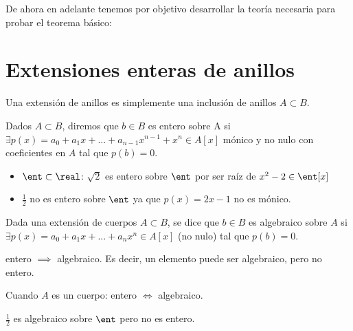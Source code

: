 De ahora en adelante tenemos por objetivo desarrollar la teoría necesaria para probar el teorema básico:

\section{Extensiones enteras de anillos}

Una extensión de anillos es simplemente una inclusión de anillos $A\subset B$.

\begin{defn}
	Dados $A \subset B$, diremos que $b \in B$ es entero sobre A si $\exists p(x)=a_0+a_1x+...+a_{n-1}x^{n-1}+x^n \in A[x]$ mónico y no nulo con coeficientes en $A$ tal que $p(b)=0$.
\end{defn}

\begin{example}
	\begin{itemize}
	\item $\ent \subset \real$: $\sqrt{2}$ es entero sobre $\ent$ por ser raíz de $x^2-2 \in \ent[x]$
	\item $\frac{1}{2}$ no es entero sobre $\ent$ ya que $p(x)=2x-1$ no es mónico.
	\end{itemize}
\end{example}

\begin{defn}
	Dada una extensión de cuerpos $A \subset B$, se dice que $b \in B$ es algebraico sobre $A$ si $\exists p(x)=a_0+a_1x+...+a_nx^n \in A[x]$ (no nulo) tal que $p(b)=0$.
\end{defn}

\obs entero $\implies$ algebraico. Es decir, un elemento puede ser algebraico, pero no entero.

\obs Cuando $A$ es un cuerpo: entero $\Leftrightarrow$ algebraico.


\begin{example}
	$\frac{1}{2}$ es algebraico sobre $\ent$ pero no es entero.
\end{example}

